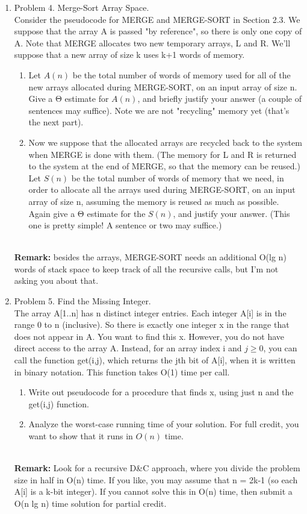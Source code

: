 \documentclass[11pt]{article}
\begin{document}
\begin{enumerate}
\item Problem 4. Merge-Sort Array Space.\\
Consider the pseudocode for MERGE and MERGE-SORT in Section 2.3. We suppose that the array A is passed "by reference", so there is only one copy of A. Note that MERGE allocates two new temporary arrays, L and R. We'll suppose that a new array of size k uses k+1 words of memory.
    \begin{enumerate}
        \item Let $A(n)$ be the total number of words of memory used for all of the new arrays allocated during MERGE-SORT, on an input array of size n. Give a Θ estimate for $A(n)$, and briefly justify your answer (a couple of sentences may suffice). Note we are not "recycling" memory yet (that's the next part).

        \item Now we suppose that the allocated arrays are recycled back to the system when MERGE is done with them. (The memory for L and R is returned to the system at the end of MERGE, so that the memory can be reused.) Let $S(n)$ be the total number of words of memory that we need, in order to allocate all the arrays used during MERGE-SORT, on an input array of size n, assuming the memory is reused as much as possible. Again give a Θ estimate for the $S(n)$, and justify your answer. (This one is pretty simple! A sentence or two may suffice.)

    \end{enumerate}
        \\
        \textbf{Remark: }besides the arrays, MERGE-SORT needs an additional O(lg n) words of stack space to keep track of all the recursive calls, but I'm not asking you about that.

\item Problem 5. Find the Missing Integer.\\
The array A[1..n] has n distinct integer entries. Each integer A[i] is in the range 0 to n (inclusive). So there is exactly one integer x in the range that does not appear in A. You want to find this x. However, you do not have direct access to the array A. Instead, for an array index i and $j≥0$, you can call the function get(i,j), which returns the jth bit of A[i], when it is written in binary notation. This function takes O(1) time per call.
    \begin{enumerate}
        \item Write out pseudocode for a procedure that finds x, using just n and the get(i,j) function.

        \item Analyze the worst-case running time of your solution. For full credit, you want to show that it runs in $O(n)$ time.
    \end{enumerate}

        \\
        \textbf{Remark: }Look for a recursive D&C approach, where you divide the problem size in half in O(n) time. If you like, you may assume that n = 2k-1 (so each A[i] is a k-bit integer). If you cannot solve this in O(n) time, then submit a O(n lg n) time solution for partial credit.


\end{enumerate}
\end{document}
